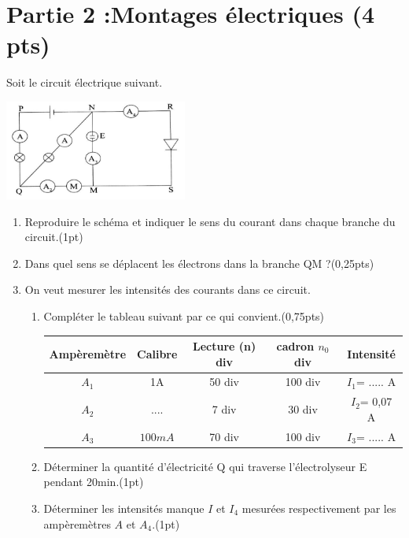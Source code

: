 \documentclass[12pt]{article}
\begin{document}
 \section*{Partie 2 :Montages électriques \dotfill(4 pts)}
Soit le circuit électrique suivant.
	\begin{center}
	\includegraphics[width=0.45\textwidth]{./img/ex02.png}
\end{center}
\begin{enumerate}
	\item Reproduire le schéma et indiquer le sens du courant dans chaque branche
du circuit.\dotfill(1pt)

\item  Dans quel sens se déplacent les électrons dans la branche QM ?\dotfill(0,25pts)

\item On veut mesurer les intensités des courants dans ce circuit.
	\begin{enumerate}
		\item Compléter le tableau suivant par ce qui convient.\dotfill(0,75pts)
		
\begin{center}
\begin{tabular}{ | c | c | c | c| c| }
	\hline
	\textbf{Ampèremètre}& \textbf{Calibre} & \textbf{Lecture (n) div} & \textbf{cadron $n_0$ div}  & \textbf{Intensité}\\\hline 

	$A_1$ & 1A & 50 div& 100 div&$I_1$= ..... A \\\hline  
	$A_2$ & .... & 7 div& 30 div&$I_2$= 0,07 A \\\hline  
	$A_3$ & $100mA$ & 70 div& 100 div&$I_3$= ..... A \\\hline  
\end{tabular}
\end{center}


		\item Déterminer la quantité d’électricité Q qui traverse l’électrolyseur E pendant 20min.\dotfill(1pt)


		\item Déterminer les intensités manque $I$ et $I_4$ mesurées respectivement par les ampèremètres $A$ et $A_4$.\dotfill(1pt)

\end{enumerate}
\end{enumerate}
\end{document}
